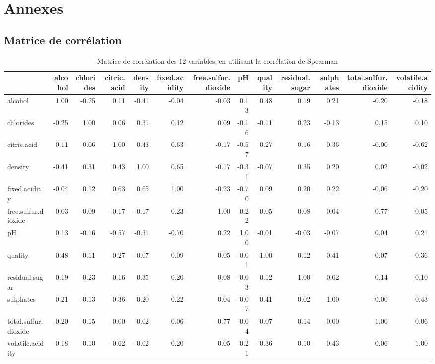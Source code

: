 \documentclass[11pt,a4paper]{article}
\begin{document}
\newpage
\section{Annexes}
\appendix
\subsection{Matrice de corrélation}
\label{sec:cor}
\begin{table}[h]
	\centering
	\begin{adjustbox}{width=1\textwidth}
	\begin{tabular}{lrrrrrrrrrrrr}
		\hline
		& alcohol & chlorides & citric.acid & density & fixed.acidity & free.sulfur.dioxide & pH & quality & residual.sugar & sulphates & total.sulfur.dioxide & volatile.acidity \\ 
		\hline
		alcohol & 1.00 & -0.25 & 0.11 & -0.41 & -0.04 & -0.03 & 0.13 & 0.48 & 0.19 & 0.21 & -0.20 & -0.18 \\ 
		chlorides & -0.25 & 1.00 & 0.06 & 0.31 & 0.12 & 0.09 & -0.16 & -0.11 & 0.23 & -0.13 & 0.15 & 0.10 \\ 
		citric.acid & 0.11 & 0.06 & 1.00 & 0.43 & 0.63 & -0.17 & -0.57 & 0.27 & 0.16 & 0.36 & -0.00 & -0.62 \\ 
		density & -0.41 & 0.31 & 0.43 & 1.00 & 0.65 & -0.17 & -0.31 & -0.07 & 0.35 & 0.20 & 0.02 & -0.02 \\ 
		fixed.acidity & -0.04 & 0.12 & 0.63 & 0.65 & 1.00 & -0.23 & -0.70 & 0.09 & 0.20 & 0.22 & -0.06 & -0.20 \\ 
		free.sulfur.dioxide & -0.03 & 0.09 & -0.17 & -0.17 & -0.23 & 1.00 & 0.22 & 0.05 & 0.08 & 0.04 & 0.77 & 0.05 \\ 
		pH & 0.13 & -0.16 & -0.57 & -0.31 & -0.70 & 0.22 & 1.00 & -0.01 & -0.03 & -0.07 & 0.04 & 0.21 \\ 
		quality & 0.48 & -0.11 & 0.27 & -0.07 & 0.09 & 0.05 & -0.01 & 1.00 & 0.12 & 0.41 & -0.07 & -0.36 \\ 
		residual.sugar & 0.19 & 0.23 & 0.16 & 0.35 & 0.20 & 0.08 & -0.03 & 0.12 & 1.00 & 0.02 & 0.14 & 0.10 \\ 
		sulphates & 0.21 & -0.13 & 0.36 & 0.20 & 0.22 & 0.04 & -0.07 & 0.41 & 0.02 & 1.00 & -0.00 & -0.43 \\ 
		total.sulfur.dioxide & -0.20 & 0.15 & -0.00 & 0.02 & -0.06 & 0.77 & 0.04 & -0.07 & 0.14 & -0.00 & 1.00 & 0.06 \\ 
		volatile.acidity & -0.18 & 0.10 & -0.62 & -0.02 & -0.20 & 0.05 & 0.21 & -0.36 & 0.10 & -0.43 & 0.06 & 1.00 \\ 
		\hline
	\end{tabular}
	\end{adjustbox}
\caption{Matrice de corrélation des 12 variables, en utilisant la corrélation de Spearman}
\label{table:cor}
\end{table}
\FloatBarrier
\end{document}
